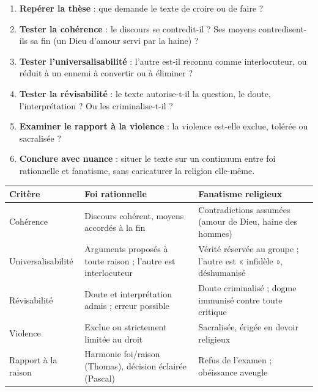 \documentclass[11pt]{article}
\begin{document}
\begin{methode}
\begin{enumerate}
\item \textbf{Repérer la thèse} : que demande le texte de croire ou de faire ?
\item \textbf{Tester la cohérence} : le discours se contredit-il ? Ses moyens contredisent-ils sa fin (un Dieu d'amour servi par la haine) ?
\item \textbf{Tester l'universalisabilité} : l'autre est-il reconnu comme interlocuteur, ou réduit à un ennemi à convertir ou à éliminer ?
\item \textbf{Tester la révisabilité} : le texte autorise-t-il la question, le doute, l'interprétation ? Ou les criminalise-t-il ?
\item \textbf{Examiner le rapport à la violence} : la violence est-elle exclue, tolérée ou sacralisée ?
\item \textbf{Conclure avec nuance} : situer le texte sur un continuum entre foi rationnelle et fanatisme, sans caricaturer la religion elle-même.
\end{enumerate}
\end{methode}

\begin{center}
\begin{tabularx}{\linewidth}{|l|X|X|}
\hline
\rowcolor{popblueL}
\textbf{Critère} & \textbf{Foi rationnelle} & \textbf{Fanatisme religieux} \\
\hline
Cohérence & Discours cohérent, moyens accordés à la fin & Contradictions assumées (amour de Dieu, haine des hommes) \\
\hline
Universalisabilité & Arguments proposés à toute raison ; l'autre est interlocuteur & Vérité réservée au groupe ; l'autre est « infidèle », déshumanisé \\
\hline
Révisabilité & Doute et interprétation admis ; erreur possible & Doute criminalisé ; dogme immunisé contre toute critique \\
\hline
Violence & Exclue ou strictement limitée au droit & Sacralisée, érigée en devoir religieux \\
\hline
Rapport à la raison & Harmonie foi/raison (Thomas), décision éclairée (Pascal) & Refus de l'examen ; obéissance aveugle \\
\hline
\end{tabularx}
\end{center}
\end{document}
